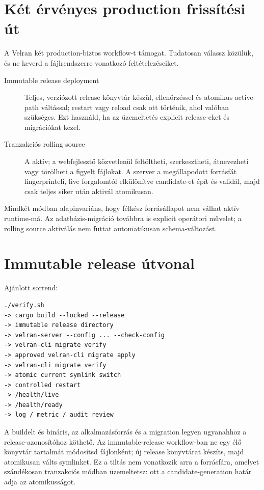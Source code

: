 \section{Két érvényes production frissítési út}

A Velran két production-biztos workflow-t támogat. Tudatosan válassz közülük, és ne keverd a fájlrendszerre vonatkozó feltételezéseiket.

\begin{description}
  \item[Immutable release deployment] Teljes, verziózott release könyvtár készül, ellenőrzéssel és atomikus active-path váltással; restart vagy reload csak ott történik, ahol valóban szükséges. Ezt használd, ha az üzemeltetés explicit release-eket és migrációkat kezel.
  \item[Tranzakciós rolling source] A  aktív; a webfejlesztő közvetlenül feltöltheti, szerkesztheti, átnevezheti vagy törölheti a figyelt  fájlokat. A szerver a megállapodott forrásfát fingerprinteli, live forgalomtól elkülönítve candidate-et épít és validál, majd csak teljes siker után aktivál atomikusan.
\end{description}

Mindkét módban alapinvariáns, hogy félkész forrásállapot nem válhat aktív runtime-má. Az adatbázis-migráció továbbra is explicit operátori művelet; a rolling source aktiválás nem futtat automatikusan schema-változást.

\section{Immutable release útvonal}

Ajánlott sorrend:

\begin{lstlisting}
./verify.sh
-> cargo build --locked --release
-> immutable release directory
-> velran-server --config ... --check-config
-> velran-cli migrate verify
-> approved velran-cli migrate apply
-> velran-cli migrate verify
-> atomic current symlink switch
-> controlled restart
-> /health/live
-> /health/ready
-> log / metric / audit review
\end{lstlisting}

A buildelt  és  bináris, az alkalmazásforrás és a migration legyen ugyanahhoz a release-azonosítóhoz köthető. Az immutable-release workflow-ban ne egy élő  könyvtár tartalmát módosítsd fájlonként; új release könyvtárat készíts, majd atomikusan válts symlinket. Ez a tiltás nem vonatkozik arra a forrásfára, amelyet szándékosan tranzakciós  módban üzemeltetsz: ott a candidate-generation határ adja az atomikusságot.

